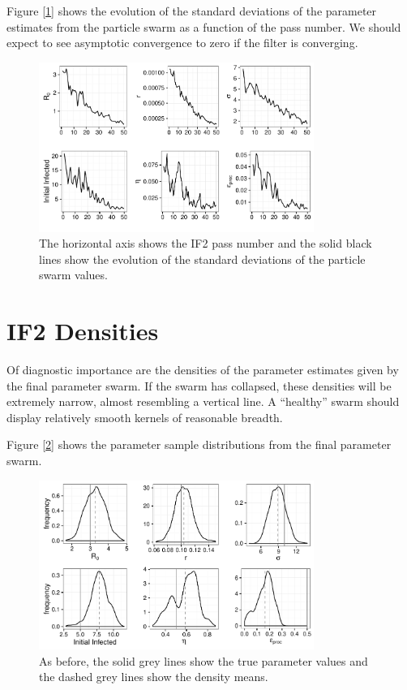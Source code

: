    Figure [\ref{if2sdconvergence}] shows the evolution of the standard deviations of the parameter estimates from the particle swarm as a function of the pass number. We should expect to see asymptotic convergence to zero if the filter is converging.

    \begin{figure}
        \centering
        \captionsetup{width=.8\linewidth}
        \includegraphics[width=0.8\textwidth]{./images/if2sdconvergence.pdf}
        \caption{The horizontal axis shows the IF2 pass number and the solid black lines show the evolution of the standard deviations of the particle swarm values. \label{if2sdconvergence}}
    \end{figure}


\section{IF2 Densities}

	Of diagnostic importance are the densities of the parameter estimates given by the final parameter swarm. If the swarm has collapsed, these densities will be extremely narrow, almost resembling a vertical line. A ``healthy'' swarm should display relatively smooth kernels of reasonable breadth.

	Figure [\ref{sc1if2kernels}] shows the parameter sample distributions from the final parameter swarm.

	\begin{figure}
        \centering
        \captionsetup{width=.8\linewidth}
        \includegraphics[width=0.8\textwidth]{./images/if2kernels.pdf}
        \caption{As before, the solid grey lines show the true parameter values and the dashed grey lines show the density means. \label{sc1if2kernels}}
    \end{figure}

